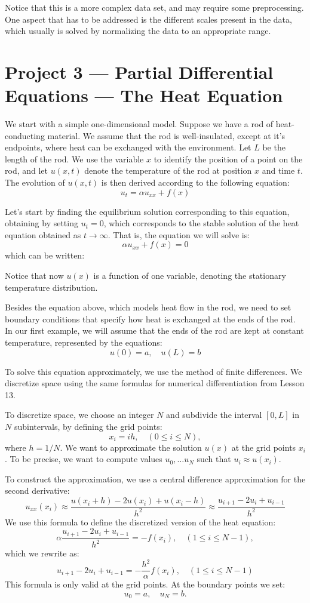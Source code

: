 \documentclass[12pt]{article}
\begin{document}
Notice that this is a more complex data set, and may require some preprocessing. One aspect that has to be addressed is the different scales present in the data, which usually is solved by normalizing the data to an appropriate range.

\section{Project 3 --- Partial Differential Equations --- The Heat Equation}
We start with a simple one-dimensional model. Suppose we have a rod of heat-conducting material. We assume that  the rod is well-insulated, except at it's endpoints, where heat can be exchanged with the environment. Let $L$ be the length of the rod. We use the variable $x$ to identify the position of a point on the rod, and let $u(x,t)$ denote the temperature of the rod at position $x$ and time $t$. The evolution of $u(x,t)$ is then derived according to the following equation:
$$
u_t=\alpha u_{xx}+f(x)
$$

Let's start by finding the equilibrium solution corresponding to this equation, obtaining by setting $u_t=0$, which corresponds to the stable solution of the heat equation obtained as $t\to\infty$. That is, the equation we will solve is:
\[
\alpha u_{xx}+f(x)=0
\]
which can be written:

Notice that now $u(x)$ is a function of one variable, denoting the stationary temperature distribution.

Besides the equation above, which models heat flow in the rod, we need to set boundary conditions that specify how heat is exchanged at the ends of the rod. In our first example, we will assume that the ends of the rod are kept at constant temperature, represented by the equations:
$$
u(0)=a,\quad u(L)=b
$$

To solve this equation approximately, we use the method of finite differences. We discretize space using the same formulas for numerical differentiation from Lesson 13. 

To discretize space, we choose an integer $N$ and subdivide the interval $[0,L]$ in $N$ subintervals, by defining the grid points:
\[
x_i=ih,\quad(0\le i\le N),
\]
where $h=1/N$. We want to approximate the solution $u(x)$ at the grid points $x_i$. To be precise, we want to compute values $u_0,\ldots u_N$ such that $u_i\approx u(x_i)$.

To construct the approximation, we use a central difference approximation for the second derivative:
$$
u_{xx}(x_i)\approx \frac{u(x_i+h)-2u(x_i)+u(x_i-h)}{h^2}\approx \frac{u_{i+1}-2u_i+u_{i-1}}{h^2}
$$
We use this formula to define the discretized version of the heat equation:
$$
\alpha \frac{u_{i+1}-2u_i+u_{i-1}}{h^2}=-f(x_i),\quad (1\le i\le N-1),
$$
which we rewrite as:
$$
u_{i+1}-2 u_i+u_{i-1}=-\frac{h^2}{\alpha}f(x_i),\quad (1\le i\le N-1)
$$
This formula is only valid at the grid points. At the boundary points we set:
$$
u_0=a,\quad u_N=b.
$$
\end{document}
